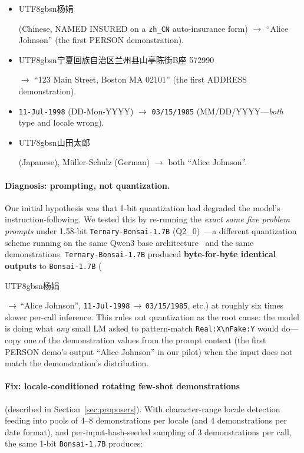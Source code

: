 \documentclass[11pt]{article}
\newcommand{\code}[1]{\texttt{#1}}
\newcommand{\arrowto}{\ensuremath{\rightarrow}}
\newcommand{\bonsai}{\code{Bonsai-1.7B}}
\newcommand{\ternary}{\code{Ternary-Bonsai-1.7B}}
\newcommand{\cjk}[1]{\begin{CJK*}{UTF8}{gbsn}#1\end{CJK*}}
\begin{document}
\begin{itemize}[leftmargin=*, itemsep=1pt, topsep=2pt]
  \item \cjk{杨娟} (Chinese, NAMED INSURED on a \code{zh\_CN}
        auto-insurance form) \arrowto{} ``Alice Johnson'' (the first
        PERSON demonstration).
  \item \cjk{宁夏回族自治区兰州县山亭陈街B座 572990} \arrowto{}
        ``123 Main Street, Boston MA 02101'' (the first ADDRESS
        demonstration).
  \item \code{11-Jul-1998} (DD-Mon-YYYY) \arrowto{} \code{03/15/1985}
        (MM/DD/YYYY---\emph{both} type and locale wrong).
  \item \cjk{山田太郎} (Japanese), M\"uller-Schulz (German) \arrowto{}
        both ``Alice Johnson''.
\end{itemize}

\paragraph{Diagnosis: prompting, not quantization.}
Our initial hypothesis was that 1-bit quantization had degraded the
model's instruction-following. We tested this by re-running the
\emph{exact same five problem prompts} under 1.58-bit \ternary{}
(Q2\_0)~\cite{ternarybonsai}---a different quantization scheme running
on the same Qwen3 base architecture~\cite{qwen3} and the same
demonstrations. \ternary{} produced \textbf{byte-for-byte identical
outputs} to \bonsai{} (\cjk{杨娟}\,\arrowto\,``Alice Johnson'',
\code{11-Jul-1998}\,\arrowto\,\code{03/15/1985}, etc.) at roughly
six times slower per-call inference. This rules out quantization as the
root cause: the model is doing what \emph{any} small LM asked to
pattern-match \code{Real:X\textbackslash{}nFake:Y} would do---copy
one of the demonstration values from the prompt context (the first
PERSON demo's output ``Alice Johnson'' in our pilot) when the input
does not match the demonstration's distribution.

\paragraph{Fix: locale-conditioned rotating few-shot demonstrations}
(described in Section~\ref{sec:proposers}). With character-range locale
detection feeding into pools of 4--8 demonstrations per locale (and 4
demonstrations per date format), and per-input-hash-seeded sampling of
3 demonstrations per call, the same 1-bit \bonsai{} produces:
\end{document}
